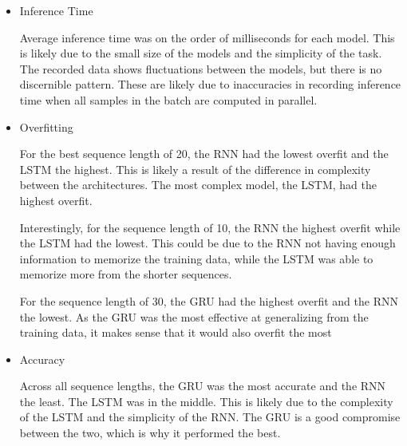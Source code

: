 \documentclass{article}
\begin{document}
\begin{enumerate}[label=1\alph*. ]
\begin{itemize}
        \item Inference Time
        
            Average inference time was on the order of
            milliseconds for each model. This is likely due
            to the small size of the models and the
            simplicity of the task. The recorded data shows
            fluctuations between the models, but there is no
            discernible pattern. These are likely due to
            inaccuracies in recording inference time when
            all samples in the batch are computed in
            parallel.

        \item Overfitting
        
            For the best sequence length of 20, the RNN had
            the lowest overfit and the LSTM the highest. This
            is likely a result of the difference in
            complexity between the architectures. The most
            complex model, the LSTM, had the highest
            overfit.

            Interestingly, for the sequence length of 10,
            the RNN the highest overfit while the LSTM had
            the lowest. This could be due to the RNN not
            having enough information to memorize the
            training data, while the LSTM was able to
            memorize more from the shorter sequences.

            For the sequence length of 30, the GRU had the
            highest overfit and the RNN the lowest. As the
            GRU was the most effective at generalizing from
            the training data, it makes sense that it would
            also overfit the most
        
        \item Accuracy
        
            Across all sequence lengths, the GRU was the
            most accurate and the RNN the least. The LSTM
            was in the middle. This is likely due to the
            complexity of the LSTM and the simplicity of the
            RNN. The GRU is a good compromise between the
            two, which is why it performed the best.

    
    \end{itemize}

\end{enumerate}
\end{document}
